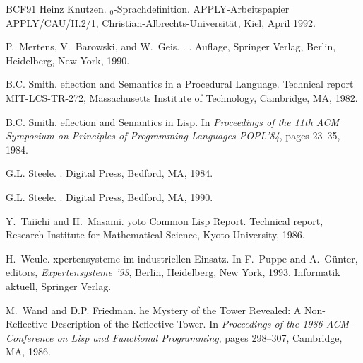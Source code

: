 \begin{thebibliography}{BCF{\etalchar{+}}91}
Heinz Knutzen.
$_0$-{S}prachdefinition.
\newblock APPLY-Arbeitspapier APPLY/CAU/II.2/1,
  Christian-Albrechts-Universit\"at, Kiel, April 1992.

P.~Mertens, V.~Barowski, and W.~Geis.
.
. Auflage, Springer Verlag, Berlin, Heidelberg, New York, 1990.

{B.C.} Smith.
eflection and {S}emantics in a {P}rocedural {L}anguage.
\newblock Technical report MIT-LCS-TR-272, Massachusetts Institute of
  Technology, Cambridge, MA, 1982.

{B.C.} Smith.
eflection and {S}emantics in {L}isp.
\newblock In {\em Proceedings of the 11th ACM Symposium on Principles of
  Programming Languages POPL'84}, pages 23--35, 1984.

{G.L.} Steele.
.
\newblock Digital Press, Bedford, MA, 1984.

{G.L.} Steele.
.
\newblock Digital Press, Bedford, MA, 1990.

Y.~Taiichi and H.~Masami.
yoto {C}ommon {L}isp {R}eport.
\newblock Technical report, Research Institute for Mathematical Science, Kyoto
  University, 1986.

H.~Weule.
xpertensysteme im industriellen {E}insatz.
\newblock In F.~Puppe and A.~G\"unter, editors, {\em Expertensysteme '93},
  Berlin, Heidelberg, New York, 1993. Informatik aktuell, Springer Verlag.

M.~Wand and {D.P.} Friedman.
he {M}ystery of the {T}ower {R}evealed: {A} {N}on-{R}eflective
  {D}escription of the {R}eflective {T}ower.
\newblock In {\em Proceedings of the 1986 ACM-Conference on Lisp and Functional
  Programming}, pages 298--307, Cambridge, MA, 1986.

\end{thebibliography}

\thispagestyle{empty}

